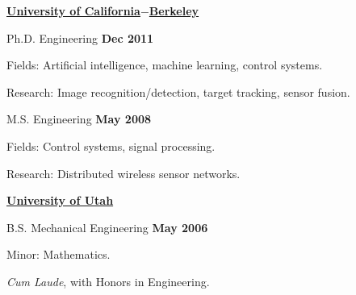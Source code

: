 %
\href{http://www.berkeley.edu/}{\textbf{University of California$-$Berkeley}}
\begin{outerlist}
\item[] Ph.D.
		Engineering \hfill \textbf{Dec 2011}
        \begin{innerlist}
        \item Fields: Artificial intelligence, machine learning, control systems.
        \item Research: Image recognition/detection, target tracking, sensor fusion.
        \end{innerlist}
\item[] M.S.
        Engineering \hfill \textbf{May 2008}
        \begin{innerlist}
        \item Fields: Control systems, signal processing.
        \item Research: Distributed wireless sensor networks.
        \end{innerlist}
\end{outerlist}

\halfblankline

\href{http://www.utah.edu/}{\textbf{University of Utah}}
\begin{outerlist}
\item[] B.S. Mechanical Engineering
		\hfill \textbf{May 2006}
        \begin{innerlist}
        \item Minor: Mathematics.
        \item \emph{Cum Laude}, with Honors in Engineering.
        \end{innerlist}
\end{outerlist}